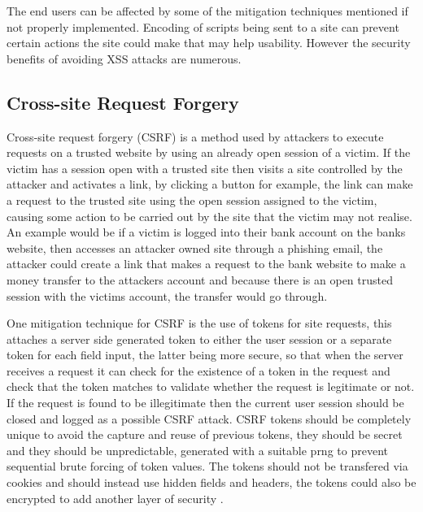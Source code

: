 \documentclass{ueacmpstyle}
\begin{document}
      The end users can be affected by some of the mitigation techniques mentioned if not 
      properly implemented. Encoding of scripts being sent to a site can prevent certain 
      actions the site could make that may help usability. However the security benefits 
      of avoiding XSS attacks are numerous.

      \subsection{Cross-site Request Forgery}\label{sub:CSRF}
      Cross-site request forgery (CSRF) is a method used by attackers to execute requests on 
      a trusted website by using an already open session of a victim. If the victim has a 
      session open with a trusted site then visits a site controlled by the attacker and 
      activates a link, by clicking a button for example, the link can make a request to 
      the trusted site using the open session assigned to the victim, causing some action to be 
      carried out by the site that the victim may not realise. An example would be if a 
      victim is logged into their bank account on the banks website, then accesses an attacker 
      owned site through a phishing email, the attacker could create a link that makes a request
      to the bank website to make a money transfer to the attackers account and because there 
      is an open trusted session with the victims account, the transfer would go through.
      
      One mitigation technique for CSRF is the use of tokens for site requests, this attaches 
      a server side generated token to either the user session or a separate token for each 
      field input, the latter being more secure, so that when the server receives a request 
      it can check for the existence of a token in the request and check that the token matches 
      to validate whether the request is legitimate or not. If the request is found to be 
      illegitimate then the current user session should be closed and logged as a possible 
      CSRF attack. CSRF tokens should be completely unique to avoid the capture and reuse of 
      previous tokens, they should be secret and they should be unpredictable, generated with 
      a suitable prng to prevent sequential brute forcing of token values. The tokens should 
      not be transfered via cookies and should instead use hidden fields and headers, the 
      tokens could also be encrypted to add another layer of security \citep{OWASPCSRFPrevention}.
\end{document}
